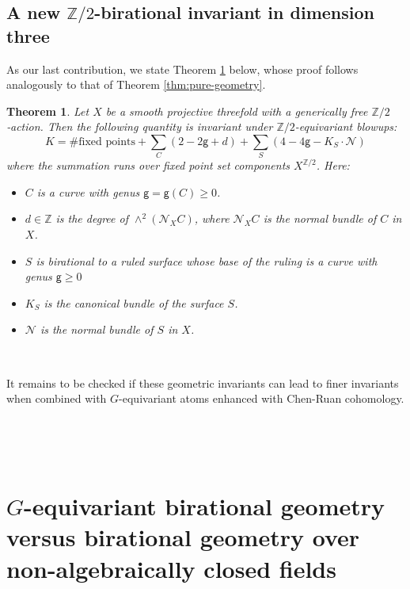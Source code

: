 \documentclass[12pt,a4paper]{amsart}
\newtheorem{theorem}{Theorem}[section]
\theoremstyle{definition}
\theoremstyle{remark}
\begin{document}
\subsection{A new  $\mathbb Z/2$-birational invariant in dimension three}
\label{sec:dimension-3-2}

As our last contribution, we state Theorem \ref{thm:pure-geometry-2d} below, whose proof follows analogously to that of Theorem \ref{thm:pure-geometry}. 

\begin{theorem}\label{thm:pure-geometry-2d}
    Let $X$ be a smooth projective threefold with a generically free $\mathbb Z/2$‐action.  Then the following quantity is invariant under \(\mathbb{Z}/2\)-equivariant blowups:
\begin{equation}
  K = 
    \#\text{fixed points}
    + 
    \sum_{C} \left(2 - 2\mathsf{g} + d\right)
    +
    \sum_{S} \left(4 - 4\mathsf{g} - K_S\cdot \mathcal N\right)
\end{equation}
where the summation runs over fixed point set components $X^{\mathbb Z/2}$. Here:
\begin{itemize}
  \item 
   $C$ is a curve with genus \(\mathsf{g}=\mathsf{g}(C) \geq 0\).
  \item 
    \(d \in \mathbb{Z}\) is the degree of \(\wedge^{2}(\mathcal{N}_XC)\), where \(\mathcal{N}_XC\) is the normal bundle of $C$ in $X$.
  \item $S$ is birational to a ruled surface whose base of the ruling is a curve with genus 
    \(\mathsf{g} \geq 0\) 
  \item 
    \(K_{S}\) is the canonical bundle of the surface \(S\).
  \item 
    \(\mathcal{N}\) is the normal bundle of \(S\) in $X$.
\end{itemize}
\end{theorem}

\ 

It remains to be checked if these geometric invariants can lead to finer invariants when combined with $G$-equivariant atoms enhanced with Chen-Ruan cohomology.

\ 

\ 

\appendix

\section{$G$-equivariant birational geometry versus birational geometry over non-algebraically closed fields}
\label{ap:specialization}
\end{document}

